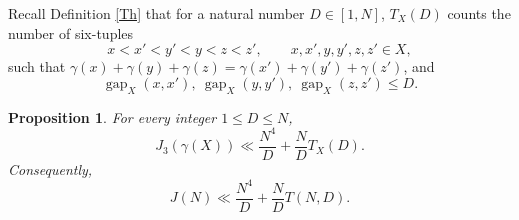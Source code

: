 \documentclass{amsart}
\numberwithin{equation}{section}
\newtheorem{proposition}[theorem]{Proposition}
\begin{document}
Recall Definition \ref{Th} that for a natural number $D\in[1, N]$, $T_X(D)$ counts the number of six-tuples
\[
x < x' < y' < y < z < z',
\qquad
x,x',y,y',z,z' \in X,
\]
such that $\gamma(x)+\gamma(y)+\gamma(z)=\gamma(x')+\gamma(y')+\gamma(z')$, and
\[
\operatorname{gap}_X(x,x'),\
\operatorname{gap}_X(y,y'), \
\operatorname{gap}_X(z,z') \leq D.
\]

\begin{proposition} 
    \label{telescoping-prop}
    For every integer $1\leq D\leq N$,
    \begin{equation}
        \nonumber
        J_3(\gamma(X))\ll\frac{N^4}{D}+\frac ND T_X(D).
    \end{equation}
    Consequently,
    \begin{equation}
        \label{first-key}
        J(N)\ll\frac{N^4}{D}+\frac ND T(N,D).
    \end{equation}
\end{proposition}
\end{document}
